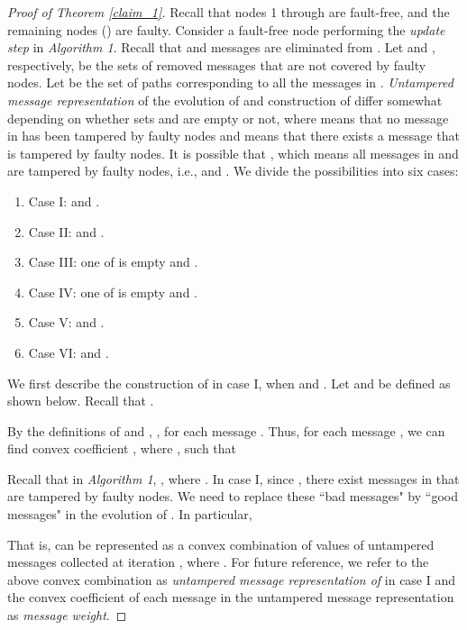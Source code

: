 \documentclass[letterpaper, 11pt]{article}
\begin{document}
\begin{proof}[Proof of Theorem \ref{claim_1}]
 
Recall that nodes 1 through  are fault-free, and the remaining
 nodes () are faulty.
Consider a fault-free node  performing the {\em update step}
in \emph {Algorithm 1}.
Recall that  and  messages are eliminated from . Let  and , respectively, be the sets of removed messages that are not covered by faulty nodes.
Let  be the set of paths corresponding to all the messages in .
\emph{Untampered message representation} of the evolution of  and construction of  differ somewhat depending on whether sets  and  are empty or not, where  means that no message in  has been tampered by faulty nodes and  means that there exists a message that is tampered by faulty nodes. It is possible that , which means all messages in  and  are tampered by faulty nodes, i.e.,  and . We divide the possibilities into six cases:

\begin{enumerate}
\item Case I:  and .
\item Case II:  and .
\item Case III: one of  is empty and .
\item Case IV: one of  is empty and .
\item Case V:  and .
\item Case VI:  and .
\end{enumerate}

We first describe the construction of  in case I, when  and .
Let  and  be defined as shown below. Recall that .








By the definitions of  and , , for each message . Thus, for each message , we can find convex coefficient , where , such that


Recall that in \emph {Algorithm 1}, , where . In case I, since , there exist messages in  that are tampered by faulty nodes. We need to replace these ``bad messages" by ``good messages" in the evolution of . In particular,


That is,  can be represented as a convex combination of values of untampered messages collected at iteration , where .
For future reference, we refer to the above convex combination as \emph{untampered message representation of } in case I and the convex coefficient of each message in the untampered message representation as \emph{message weight}.


\end{proof}
\end{document}
